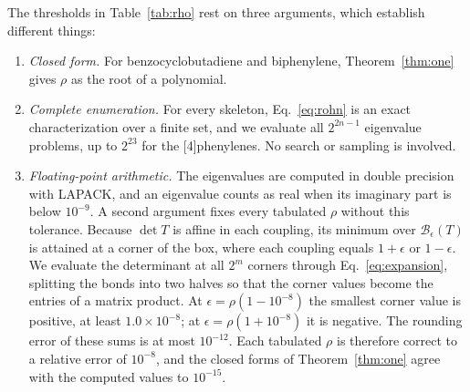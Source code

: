\documentclass[11pt]{article}
\newcommand{\Bx}{\mathcal{B}}
\begin{document}
The thresholds in Table~\ref{tab:rho} rest on three arguments, which establish different things:
\begin{enumerate}
\item \emph{Closed form.} For benzocyclobutadiene and biphenylene, Theorem~\ref{thm:one} gives $\rho$ as the root of a polynomial.
\item \emph{Complete enumeration.} For every skeleton, Eq.~\eqref{eq:rohn} is an exact characterization over a finite set, and we evaluate all $2^{2n-1}$ eigenvalue problems, up to $2^{23}$ for the [4]phenylenes. No search or sampling is involved.
\item \emph{Floating-point arithmetic.} The eigenvalues are computed in double precision with LAPACK, and an eigenvalue counts as real when its imaginary part is below $10^{-9}$. A second argument fixes every tabulated $\rho$ without this tolerance. Because $\det T$ is affine in each coupling, its minimum over $\Bx_\epsilon(T)$ is attained at a corner of the box, where each coupling equals $1+\epsilon$ or $1-\epsilon$. We evaluate the determinant at all $2^m$ corners through Eq.~\eqref{eq:expansion}, splitting the bonds into two halves so that the corner values become the entries of a matrix product. At $\epsilon=\rho(1-10^{-8})$ the smallest corner value is positive, at least $1.0\times10^{-8}$; at $\epsilon=\rho(1+10^{-8})$ it is negative. The rounding error of these sums is at most $10^{-12}$. Each tabulated $\rho$ is therefore correct to a relative error of $10^{-8}$, and the closed forms of Theorem~\ref{thm:one} agree with the computed values to $10^{-15}$.
\end{enumerate}
\end{document}
